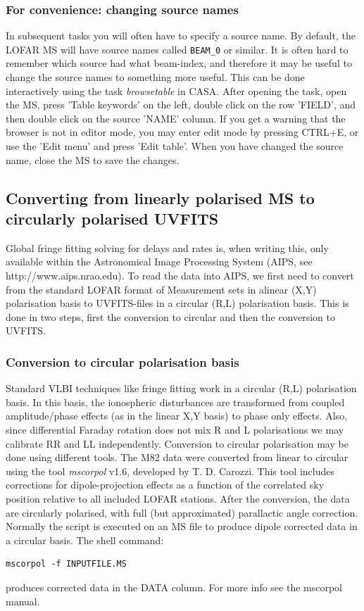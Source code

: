 \subsubsection{For convenience: changing source names}
In subsequent tasks you will often have to specify a source name. By default,
the LOFAR MS will have source names called \verb!BEAM_0! or similar. It is
often hard to remember which source had what beam-index, and therefore it may
be useful to change the source names to something more useful. This can be done
interactively using the task \emph{browsetable} in CASA.  After opening the
task, open the MS, press 'Table keywords' on the left, double click on the row
'FIELD', and then double click on the source 'NAME' column. If you get a
warning that the browser is not in editor mode, you may enter edit mode by
pressing CTRL+E, or use the 'Edit menu' and press 'Edit table'. When you have
changed the source name, close the MS to save the changes.

\subsection{Converting from linearly polarised MS to circularly polarised UVFITS}
Global fringe fitting solving for delays and rates is, when writing this,
only available within the Astronomical Image Processing System (AIPS,
see http://www.aips.nrao.edu). To read the data into AIPS, we first need
to convert from the standard LOFAR format of Measurement sets in alinear (X,Y)
polarisation basis to UVFITS-files in a circular (R,L) polarisation basis. 
This is done in two steps, first the conversion to circular and then the conversion
to UVFITS.

\subsubsection{Conversion to circular polarisation basis}
Standard VLBI techniques like fringe fitting work in a circular (R,L)
polarisation basis. In this basis, the ionospheric disturbances are transformed
from coupled amplitude/phase effects (as in the linear X,Y basis) to phase only
effects. Also, since differential Faraday rotation does not mix R and L
polarisations we may calibrate RR and LL independently. Conversion to circular
polarisation may be done using different tools.  The M82 data
\cite{varenius2014} were converted from linear to circular using the tool
\emph{mscorpol} v1.6, developed by T. D. Carozzi.  This tool includes
corrections for dipole-projection effects as a function of the correlated sky
position relative to all included LOFAR stations.  After the conversion, the
data are circularly polarised, with full (but approximated) parallactic angle
correction. 
Normally the script is executed on an MS file to produce dipole corrected data in a
circular basis. The shell command:
\begin{lstlisting}
mscorpol -f INPUTFILE.MS
\end{lstlisting}
produces corrected data in the DATA column. For more info see the mscorpol manual.

